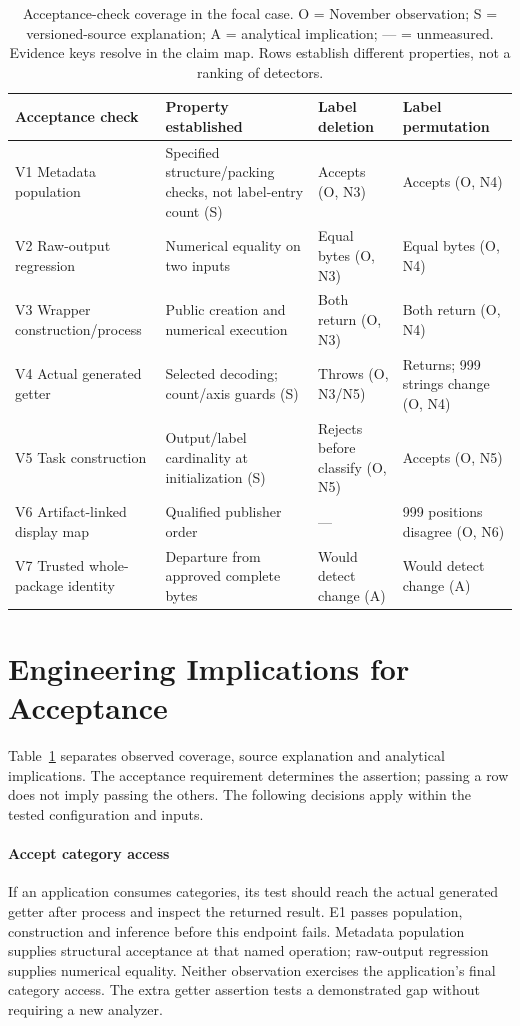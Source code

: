 \documentclass[10pt,conference]{IEEEtran}
\begin{document}
\begin{table}[t]
\caption{Acceptance-check coverage in the focal case. O = November observation; S = versioned-source explanation; A = analytical implication; --- = unmeasured. Evidence keys resolve in the claim map. Rows establish different properties, not a ranking of detectors.}
\label{tab:coverage}
\centering\small
\begin{tabularx}{\textwidth}{@{}p{}p{}XX@{}}
\toprule
Acceptance check & Property established & Label deletion & Label permutation\\
\midrule
V1 Metadata population & Specified structure/packing checks, not label-entry count (S) & Accepts (O, N3) & Accepts (O, N4)\\
V2 Raw-output regression & Numerical equality on two inputs & Equal bytes (O, N3) & Equal bytes (O, N4)\\
V3 Wrapper construction/process & Public creation and numerical execution & Both return (O, N3) & Both return (O, N4)\\
V4 Actual generated getter & Selected decoding; count/axis guards (S) & Throws (O, N3/N5) & Returns; 999 strings change (O, N4)\\
V5 Task construction & Output/label cardinality at initialization (S) & Rejects before classify (O, N5) & Accepts (O, N5)\\
V6 Artifact-linked display map & Qualified publisher order & --- & 999 positions disagree (O, N6)\\
V7 Trusted whole-package identity & Departure from approved complete bytes & Would detect change (A) & Would detect change (A)\\
\bottomrule
\end{tabularx}
\end{table}

\section{Engineering Implications for Acceptance}
\label{sec:discussion}
Table~\ref{tab:coverage} separates observed coverage, source explanation and analytical implications. The acceptance requirement determines the assertion; passing a row does not imply passing the others. The following decisions apply within the tested configuration and inputs.

\paragraph{Accept category access}
If an application consumes categories, its test should reach the actual generated getter after process and inspect the returned result. E1 passes population, construction and inference before this endpoint fails. Metadata population supplies structural acceptance at that named operation; raw-output regression supplies numerical equality. Neither observation exercises the application's final category access. The extra getter assertion tests a demonstrated gap without requiring a new analyzer.
\end{document}
